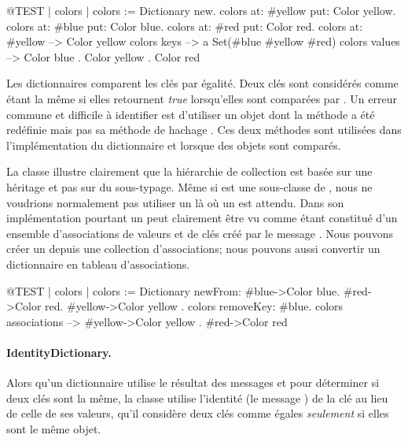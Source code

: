 \documentclass[a4paper,10pt,twoside]{book}
\begin{document}
\begin{code}{@TEST | colors |}
colors := Dictionary new.
colors at: #yellow put: Color yellow.
colors at: #blue put: Color blue.
colors at: #red put: Color red.
colors at: #yellow --> Color yellow
colors keys          --> a Set(#blue #yellow #red)
colors values       --> {Color blue . Color yellow . Color red}
\end{code}

Les dictionnaires comparent les cl\'es par \'egalit\'e. Deux cl\'es sont
consid\'er\'es comme \'etant la m\^eme si elles retournent \emph{true}
lorsqu'elles sont compar\'ees par \ct{=}. Un erreur commune et difficile \`a
identifier est d'utiliser un objet dont la m\'ethode \ct{=} a \'et\'e
red\'efinie mais pas sa m\'ethode de hachage . Ces deux
m\'ethodes sont utilis\'ees dans l'impl\'ementation du dictionnaire
et lorsque des objets sont compar\'es.

La classe  illustre clairement que la hi\'erarchie
de collection est bas\'ee sur une h\'eritage et pas sur du sous-typage.
M\^eme si  est une sous-classe de , nous
ne voudrions normalement pas utiliser un  l\`a o\`u
un  est attendu. 
Dans son impl\'ementation pourtant un  peut
clairement \^etre vu comme \'etant constitu\'e d'un ensemble d'associations
de valeurs et de cl\'es cr\'e\'e par le message . Nous
pouvons cr\'eer un  depuis une collection d'associations; nous
pouvons aussi convertir un dictionnaire en tableau d'associations.

\begin{code}{@TEST | colors |}
colors := Dictionary newFrom: { #blue->Color blue. #red->Color red. #yellow->Color yellow }.
colors removeKey: #blue.
colors associations --> {#yellow->Color yellow . #red->Color red}
\end{code}

\paragraph{IdentityDictionary.}
Alors qu'un dictionnaire utilise le r\'esultat des messages \ct{=} et  pour d\'eterminer si deux cl\'es sont la m\^eme, la classe  utilise l'identit\'e (\cad le message ) de
la cl\'e au lieu de celle de ses valeurs, \ie qu'il consid\`ere deux
cl\'es comme \'egales \emph{seulement} si elles sont le m\^eme objet.
\end{document}
